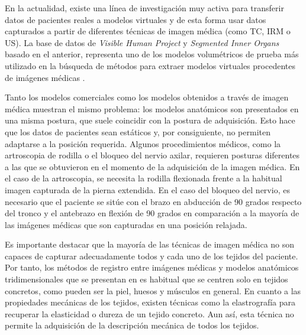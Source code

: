 En la actualidad, existe una línea de investigación muy activa para transferir datos de pacientes reales a modelos virtuales y de esta forma usar datos capturados a partir de diferentes técnicas de imagen médica (como \ac{TC}, \ac{IRM} o \ac{US}). La base de datos de  \emph{Visible Human Project} \cite{ackerman1998visible} y  \emph{Segmented Inner Organs} \cite{VoxelMan} basado en el anterior, representa uno de los modelos volumétricos de prueba más utilizado en la búsqueda de métodos para extraer modelos virtuales procedentes de imágenes médicas \cite{ferrante2017slice}.

Tanto los modelos comerciales como los modelos obtenidos a través de imagen médica muestran el mismo problema: los modelos anatómicos son presentados en una misma postura, que suele coincidir con la postura de adquisición. Esto hace que los datos de pacientes sean estáticos y, por consiguiente, no permiten adaptarse a la posición requerida. Algunos procedimientos médicos, como la artroscopia de rodilla o el bloqueo del nervio axilar, requieren posturas diferentes a las que se obtuvieron en el momento de la adquisición de la imagen médica. En el caso de la artroscopia, se necesita la rodilla flexionada frente a la habitual imagen capturada de la pierna extendida. En el caso del bloqueo del nervio, es necesario que el paciente se sitúe con el brazo en abducción de 90 grados respecto del tronco y el antebrazo en flexión de 90 grados en comparación a la mayoría de las imágenes médicas que son capturadas en una posición relajada. 

Es importante destacar que la mayoría de las técnicas de imagen médica no son capaces de capturar adecuadamente todos y cada uno de los tejidos del paciente. Por tanto, los métodos de registro entre imágenes médicas y modelos anatómicos tridimensionales que se presentan en \cite{ferrante2017slice} es habitual que se centren solo en tejidos concretos, como pueden ser la piel, huesos y músculos en general. 
En cuanto a las propiedades mecánicas de los tejidos, existen técnicas como la elastrografía \cite{MRIelastography} para recuperar la elasticidad o dureza de un tejido concreto. Aun así, esta técnica no permite la adquisición de la descripción mecánica de todos los tejidos.




